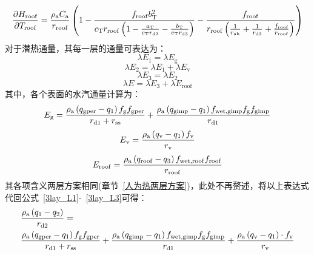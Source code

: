 %
\begin{equation}
  \frac{\partial H_{\mathrm{roof}}}{\partial T_{\mathrm{roof}}} = \frac{\rho _{\rm a} C_{\mathrm a}}{r_{\mathrm{roof}}} \left(1-\frac{f_{\mathrm{roof}} b_{\mathrm{T}}^2}{c_{\mathrm{T}} r_{\mathrm{roof}} \left(1-\frac{a_{\mathrm{T}}}{c_{\mathrm{T}} r_{\mathrm{d2}}}-\frac{b_{\mathrm{T}}}{c_{\mathrm{T}} r_{\mathrm{d3}}}\right)}-\frac{f_{\mathrm{roof}}}{r_{\mathrm{roof}}\left(\frac{1}{r_{\mathrm{ah}}}+\frac{1}{r_{\mathrm{d3}}}+\frac{f_{\mathrm{roof}}}{r_{\mathrm{roof}}}\right)}\right)
\end{equation}
对于潜热通量，其每一层的通量可表达为：
%
\begin{equation}\label{3lay_L1}
  \lambda E_{1} = \lambda E_{\mathrm{g}}
\end{equation}
%
\begin{equation}
  \lambda E_{2} = \lambda E_{1} + \lambda E_{\mathrm{v}}
\end{equation}
%
\begin{equation}\label{3lay_L2}
  \lambda E_{3} = \lambda E_{\mathrm{2}}
\end{equation}
%
\begin{equation}\label{3lay_L3}
  \lambda E = \lambda E_{3} + \lambda E_{\mathrm{roof}}
\end{equation}
其中，各个表面的水汽通量计算为：
\begin{equation}\label{3lay_Eg}
  E_{\mathrm{g}} = \frac{\rho _{\rm a} \left( q_{\mathrm{gper}}-q_{1} \right) f_{\mathrm{g}} f_{\mathrm{gper}}}{r_{\mathrm{d1}}+r_{\mathrm{ss}}} + \frac{\rho _{\rm a} \left( q_{\mathrm{gimp}}-q_{\mathrm{1}} \right) f_{\mathrm{wet,gimp}} f_{\mathrm{g}}  f_{\mathrm{gimp}}}{r_{\mathrm{d1}}}
\end{equation}
%
\begin{equation}
  E_{\mathrm{v}} = \frac{\rho _{\rm a} \left( q_{\mathrm{v}}-q_{1}\right) f_{\rm v}}{r_{\mathrm{v}}}
\end{equation}
%
\begin{equation}\label{3lay_Eroof}
  E_{\mathrm{roof}} = \frac{\rho _{\rm a} \left( q_{\mathrm{roof}}-q_{3}\right) f_{\mathrm{wet,roof}} f_{\mathrm{roof}}}{r_{\mathrm{roof}}}
\end{equation}
其各项含义两层方案相同(章节~\ref{人为热两层方案})，此处不再赘述，将以上表达式代回公式~\eqref{3lay_L1}-~\eqref{3lay_L3}可得：
\begin{equation}
  \begin{split}
    & \frac{\rho _{\rm a} \left( q_{\mathrm{1}}-q_{2}\right)}{r_{\mathrm{d2}}} = \\
    & \frac{\rho _{\rm a} \left( q_{\mathrm{gper}}-q_{1}\right) f_{\mathrm{g}} f_{\mathrm{gper}}}{r_{\mathrm{d1}}+r_{\mathrm{ss}}} + \frac{\rho _{\rm a} \left( q_{\mathrm{gimp}}-q_{1} \right) f_{\mathrm{wet,gimp}} f_{\mathrm{g}} f_{\mathrm{gimp}}}{r_{\mathrm{d1}}} + \frac{\rho _{\rm a} \left( q_{\mathrm{v}}-q_{1}\right) \cdot f_{\rm v}}{r_{\mathrm{v}}}
  \end{split}
\end{equation}
